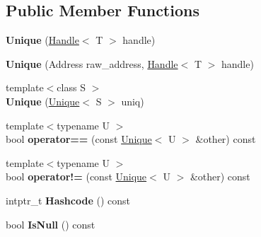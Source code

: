 \subsection*{Public Member Functions}
\begin{DoxyCompactItemize}
\item 
\hypertarget{classv8_1_1internal_1_1_unique_a19dd7082a83a6592cbbcd4dcdcea5997}{}{\bfseries Unique} (\hyperlink{classv8_1_1internal_1_1_handle}{Handle}$<$ T $>$ handle)\label{classv8_1_1internal_1_1_unique_a19dd7082a83a6592cbbcd4dcdcea5997}

\item 
\hypertarget{classv8_1_1internal_1_1_unique_a6034a98f53e2687254c30e8c6131d2ea}{}{\bfseries Unique} (Address raw\+\_\+address, \hyperlink{classv8_1_1internal_1_1_handle}{Handle}$<$ T $>$ handle)\label{classv8_1_1internal_1_1_unique_a6034a98f53e2687254c30e8c6131d2ea}

\item 
\hypertarget{classv8_1_1internal_1_1_unique_ac6ad400572a9c753ce93fabcb3727b2d}{}{\footnotesize template$<$class S $>$ }\\{\bfseries Unique} (\hyperlink{classv8_1_1internal_1_1_unique}{Unique}$<$ S $>$ uniq)\label{classv8_1_1internal_1_1_unique_ac6ad400572a9c753ce93fabcb3727b2d}

\item 
\hypertarget{classv8_1_1internal_1_1_unique_a6fbe0e7e075c198f2689cb9f9e32ca83}{}{\footnotesize template$<$typename U $>$ }\\bool {\bfseries operator==} (const \hyperlink{classv8_1_1internal_1_1_unique}{Unique}$<$ U $>$ \&other) const \label{classv8_1_1internal_1_1_unique_a6fbe0e7e075c198f2689cb9f9e32ca83}

\item 
\hypertarget{classv8_1_1internal_1_1_unique_aba3dc4b06dad347059b220629c4d69ce}{}{\footnotesize template$<$typename U $>$ }\\bool {\bfseries operator!=} (const \hyperlink{classv8_1_1internal_1_1_unique}{Unique}$<$ U $>$ \&other) const \label{classv8_1_1internal_1_1_unique_aba3dc4b06dad347059b220629c4d69ce}

\item 
\hypertarget{classv8_1_1internal_1_1_unique_ad9d0f6712417ff958f61d5e0b754bf91}{}intptr\+\_\+t {\bfseries Hashcode} () const \label{classv8_1_1internal_1_1_unique_ad9d0f6712417ff958f61d5e0b754bf91}

\item 
\hypertarget{classv8_1_1internal_1_1_unique_a13a7885564a80b0a54c82457f4a4e779}{}bool {\bfseries Is\+Null} () const \label{classv8_1_1internal_1_1_unique_a13a7885564a80b0a54c82457f4a4e779}


\end{DoxyCompactItemize}
